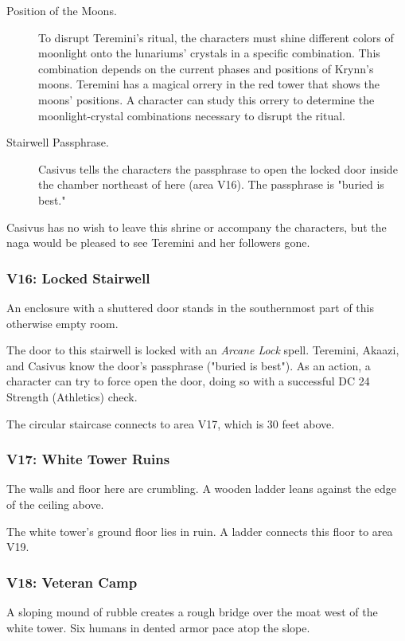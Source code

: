 \documentclass[10pt,a4paper,twoside,bg=print,twocolumn,openany,nodeprecatedcode]{dndbook}
\begin{document}
\begin{description}
\item[Position of the Moons.]
To disrupt Teremini's ritual, the characters must shine different colors of moonlight onto the lunariums' crystals in a specific combination. This combination depends on the current phases and positions of Krynn's moons. Teremini has a magical orrery in the red tower that shows the moons' positions. A character can study this orrery to determine the moonlight-crystal combinations necessary to disrupt the ritual.
\item[Stairwell Passphrase.]
Casivus tells the characters the passphrase to open the locked door inside the chamber northeast of here (area V16). The passphrase is "buried is best."
\end{description}

Casivus has no wish to leave this shrine or accompany the characters, but the naga would be pleased to see Teremini and her followers gone.

\subsubsection{V16: Locked Stairwell}
\begin{DndReadAloud}{}
An enclosure with a shuttered door stands in the southernmost part of this otherwise empty room.

\end{DndReadAloud}

The door to this stairwell is locked with an \textit{Arcane Lock} spell. Teremini, Akaazi, and Casivus know the door's passphrase ("buried is best"). As an action, a character can try to force open the door, doing so with a successful DC 24 Strength (Athletics) check.

The circular staircase connects to area V17, which is 30 feet above.

\subsubsection{V17: White Tower Ruins}
\begin{DndReadAloud}{}
The walls and floor here are crumbling. A wooden ladder leans against the edge of the ceiling above.

\end{DndReadAloud}

The white tower's ground floor lies in ruin. A ladder connects this floor to area V19.

\subsubsection{V18: Veteran Camp}
\begin{DndReadAloud}{}
A sloping mound of rubble creates a rough bridge over the moat west of the white tower. Six humans in dented armor pace atop the slope.

\end{DndReadAloud}
\end{document}
